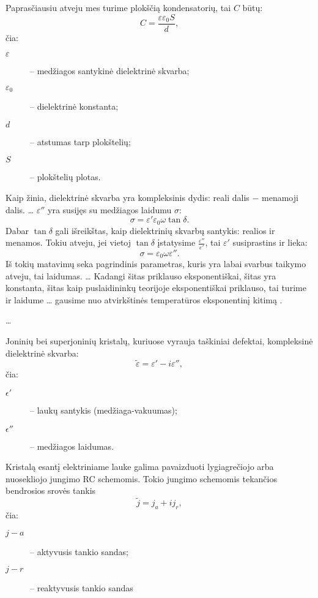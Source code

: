 Paprasčiausiu atveju mes turime plokščią kondensatorių, tai $C$ būtų:
\begin{equation*}
  C = \frac{\varepsilon \varepsilon_{0} S}{d},
\end{equation*}
čia:
\begin{description}
  \item[$\varepsilon$] – medžiagos santykinė dielektrinė skvarba;
  \item[$\varepsilon_{0}$] – dielektrinė konstanta;
  \item[$d$] – atstumas tarp plokštelių;
  \item[$S$] – plokštelių plotas.
\end{description}
Kaip žinia, dielektrinė skvarba yra kompleksinis dydis: reali dalis
$-$ menamoji dalis. … $\varepsilon''$ yra susijęs su medžiagos
laidumu $\sigma$:
\begin{equation*}
  \sigma = \varepsilon' \varepsilon_{0} \omega \tan \delta.
\end{equation*}
Dabar $\tan \delta$ gali išreikštas, kaip dielektrinių skvarbų santykis:
realios ir menamos. Tokiu atveju, jei vietoj $\tan \delta$ įstatysime
$\frac{\varepsilon''}{\varepsilon'}$, tai $\varepsilon'$ susiprastins
ir lieka:
\begin{equation*}
  \sigma = \varepsilon_{0} \omega \varepsilon''.
\end{equation*}
Iš tokių matavimų seka pagrindinis parametras, kuris yra labai
svarbus taikymo atveju, tai laidumas. … Kadangi šitas
priklauso eksponentiškai, šitas yra konstanta, šitas kaip puslaidininkų
teorijoje eksponentiškai priklauso, tai turime ir laidume …
gausime nuo atvirkštinės temperatūros eksponentinį kitimą .

… 

Joninių bei superjoninių kristalų, kuriuose vyrauja taškiniai
defektai, kompleksinė dielektrinė skvarba:
\begin{equation*}
  \tilde{\varepsilon} = \varepsilon' - i\varepsilon'',
\end{equation*}
čia:
\begin{description}
 \item[$\epsilon'$] – laukų santykis (medžiaga-vakuumas);
 \item[$\epsilon''$] – medžiagos laidumas.
\end{description}

Kristalą esantį elektriniame lauke galima pavaizduoti lygiagrečiojo
arba nuosekliojo jungimo RC schemomis. Tokio jungimo schemomis
tekančios bendrosios srovės tankis
\begin{equation*}
  \tilde{j} = j_a + ij_r,
\end{equation*}
čia:
\begin{description}
  \item[$j-a$] – aktyvusis tankio sandas;
  \item[$j-r$] – reaktyvusis tankio sandas
\end{description}

